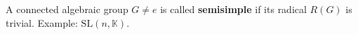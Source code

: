 A connected algebraic group $G \neq e$ is called \textbf{semisimple} if its radical $R(G)$ is trivial. Example: $\text{SL}(n, \mathbb{K})$.
